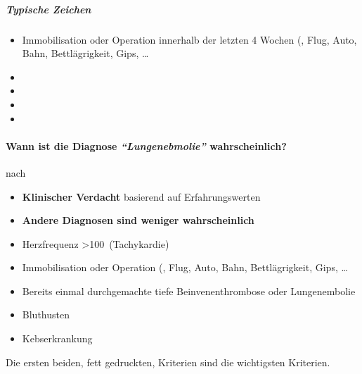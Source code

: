 \subparagraph{Typische Zeichen}

\begin{itemize}
    \item Immobilisation oder Operation innerhalb
    der letzten 4 Wochen (, Flug, Auto,
    Bahn, Bettlägrigkeit, Gips, {\dots}
    \item 
    \item {}
    \item {}
    \item {}
\end{itemize}

\paragraph{Wann ist die Diagnose \emph{"`Lungenebmolie"'}
 wahrscheinlich?} nach
\cite{Wells2000}

\begin{itemize}
    \item {\bfseries Klinischer Verdacht} basierend auf
    Erfahrungswerten
    \item {\bfseries Andere Diagnosen sind weniger
    wahrscheinlich}
    \item Herzfrequenz \textgreater 100\,
    (Tachykardie)
    \item Immobilisation oder Operation  (, Flug, Auto,
    Bahn, Bettlägrigkeit, Gips, {\dots}
    \item Bereits einmal durchgemachte tiefe
    Beinvenenthrombose oder Lungenembolie
    \item Bluthusten
    \item Kebserkrankung 
\end{itemize}

Die ersten beiden, fett gedruckten, Kriterien sind die
wichtigsten Kriterien. 



